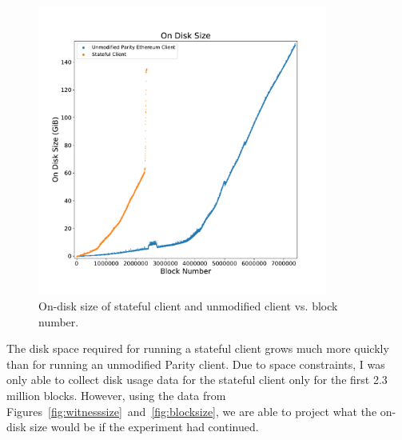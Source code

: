 \documentclass[12pt]{article}
\newcommand{\figurewidth}{0.85\textwidth}
\begin{document}
\begin{figure}[H]
  \centering
  \includegraphics[width=\figurewidth]{../figures/results/graphs/background/on-disk-size.pdf}
  \caption{On-disk size of stateful client and unmodified client vs. block number.}
  \label{fig:ondisksize}
\end{figure}

The disk space required for running a stateful client grows much more quickly than for running an unmodified Parity client. Due to space constraints, I was only able to collect disk usage data for the stateful client only for the first 2.3 million blocks. However, using the data from Figures~\ref{fig:witnesssize}~and~\ref{fig:blocksize}, we are able to project what the on-disk size would be if the experiment had continued.
\end{document}
